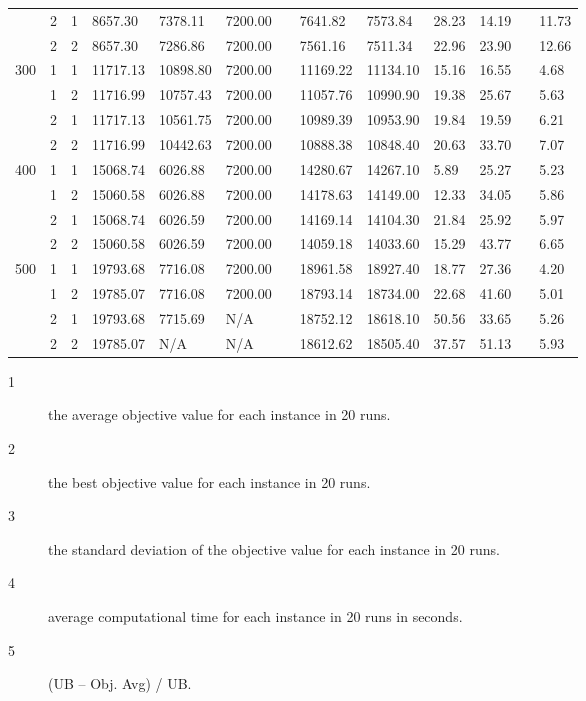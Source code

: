 \documentclass[
  english,
]{article}
\begin{document}
\begin{otherlanguage}{english}
{\begin{longtable}[]{@{}lllllllllllll@{}}
& 2 & 1 & 8657.30 & 7378.11 & 7200.00 & & 7641.82 & 7573.84 & 28.23 & 14.19 & & 11.73 \\
& 2 & 2 & 8657.30 & 7286.86 & 7200.00 & & 7561.16 & 7511.34 & 22.96 & 23.90 & & 12.66 \\
\multirow{4}{*}{300} & 1 & 1 & 11717.13 & 10898.80 & 7200.00 & & 11169.22 & 11134.10 & 15.16 & 16.55
& & 4.68 \\
& 1 & 2 & 11716.99 & 10757.43 & 7200.00 & & 11057.76 & 10990.90 & 19.38 & 25.67 & & 5.63 \\
& 2 & 1 & 11717.13 & 10561.75 & 7200.00 & & 10989.39 & 10953.90 & 19.84 & 19.59 & & 6.21 \\
& 2 & 2 & 11716.99 & 10442.63 & 7200.00 & & 10888.38 & 10848.40 & 20.63 & 33.70 & & 7.07 \\
\multirow{4}{*}{400} & 1 & 1 & 15068.74 & 6026.88 & 7200.00 & & 14280.67 & 14267.10 & 5.89 & 25.27 &
& 5.23 \\
& 1 & 2 & 15060.58 & 6026.88 & 7200.00 & & 14178.63 & 14149.00 & 12.33 & 34.05 & & 5.86 \\
& 2 & 1 & 15068.74 & 6026.59 & 7200.00 & & 14169.14 & 14104.30 & 21.84 & 25.92 & & 5.97 \\
& 2 & 2 & 15060.58 & 6026.59 & 7200.00 & & 14059.18 & 14033.60 & 15.29 & 43.77 & & 6.65 \\
\multirow{4}{*}{500} & 1 & 1 & 19793.68 & 7716.08 & 7200.00 & & 18961.58 & 18927.40 & 18.77 & 27.36
& & 4.20 \\
& 1 & 2 & 19785.07 & 7716.08 & 7200.00 & & 18793.14 & 18734.00 & 22.68 & 41.60 & & 5.01 \\
& 2 & 1 & 19793.68 & 7715.69 & N/A & & 18752.12 & 18618.10 & 50.56 & 33.65 & & 5.26 \\
& 2 & 2 & 19785.07 & N/A & N/A & & 18612.62 & 18505.40 & 37.57 & 51.13 & & 5.93 \\
\end{longtable}
}

\begin{description}
\item[1]
\protect{}\label{np075}
the average objective value for each instance in 20 runs.
\item[2]
\protect{}\label{np080}
the best objective value for each instance in 20 runs.
\item[3]
\protect{}\label{np085}
the standard deviation of the objective value for each instance in 20 runs.
\item[4]
\protect{}\label{np090}
average computational time for each instance in 20 runs in seconds.
\item[5]
\protect{}\label{np095}
(UB -- Obj. Avg) / UB.
\end{description}


\end{otherlanguage}
\end{document}
